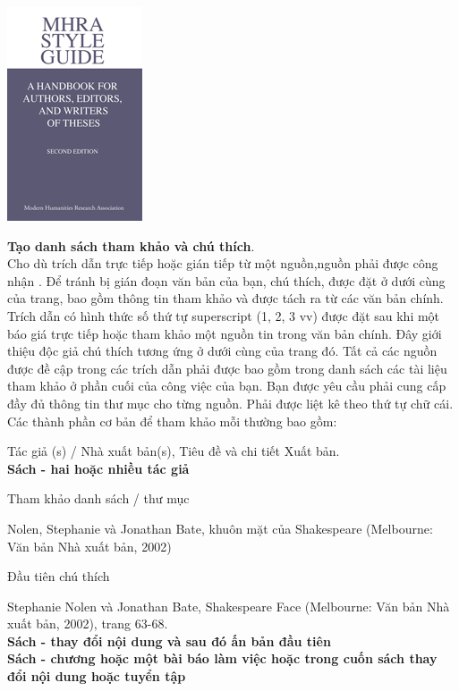 \documentclass{hcmutarticle}
\begin{document}
\begin{flushleft}
\includegraphics[scale=1.5]{hinh1}\\[1cm]
\end{flushleft}

\textbf{Tạo danh sách tham khảo và chú thích}.\\

Cho dù trích dẫn trực tiếp hoặc gián tiếp từ một nguồn,nguồn phải được công nhận
. Để tránh bị gián đoạn văn bản của bạn, chú thích, được đặt ở dưới cùng của trang, bao gồm thông tin tham khảo và được tách ra từ các văn bản chính. Trích dẫn có hình thức số thứ tự superscript (1, 2, 3 vv) được đặt sau khi một báo giá trực tiếp hoặc tham khảo một nguồn tin trong văn bản chính. Đây giới thiệu độc giả chú thích tương ứng ở dưới cùng của trang đó. Tất cả các nguồn được đề cập trong các trích dẫn phải được bao gồm trong danh sách các tài liệu tham khảo ở phần cuối của công việc của bạn. Bạn được yêu cầu phải cung cấp đầy đủ thông tin thư mục cho từng 
nguồn. Phải được liệt kê theo thứ tự chữ cái.\\

Các thành phần cơ bản để tham khảo mỗi thường bao gồm:

Tác giả (s) / Nhà xuất bản(s), Tiêu đề và chi tiết Xuất bản.
\\ {\bfseries Sách - hai hoặc nhiều tác giả}

Tham khảo danh sách / thư mục

Nolen, Stephanie và Jonathan Bate, khuôn mặt của Shakespeare (Melbourne: Văn bản Nhà xuất bản, 2002)

Đầu tiên chú thích

Stephanie Nolen và Jonathan Bate, Shakespeare Face (Melbourne: Văn bản Nhà xuất bản, 2002), trang 63-68.\\
{\bfseries Sách - thay đổi nội dung và sau đó ấn bản đầu tiên}\\
{\bfseries Sách - chương hoặc một bài báo làm việc hoặc trong cuốn sách thay đổi nội dung hoặc tuyển tập}
\end{document}
